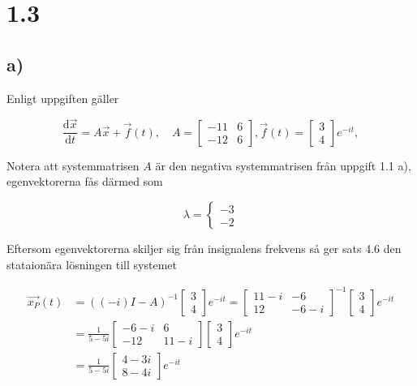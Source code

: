 \documentclass[a4paper]{article}
\newcommand{\mat}[1]{\bm{\mathit{#1}}}
\begin{document}
\section*{1.3}
\subsection*{a)}

Enligt uppgiften gäller

\begin{equation*}
  \frac{\text{d}\vec{x}}{\text{d}t} = \mat{A}\vec{x} + \vec{f}(t), \quad \mat{A} = \begin{bmatrix}-11 & 6\\-12 & 6\end{bmatrix}, \vec{f}(t) = \begin{bmatrix}3\\4\end{bmatrix}e^{-it},
\end{equation*}

\noindent Notera att systemmatrisen $\mat{A}$ är den negativa systemmatrisen
från uppgift 1.1 a), egenvektorerna fås därmed som

\begin{equation*}
  \lambda = \begin{cases}-3\\-2\end{cases}
\end{equation*}

\noindent Eftersom egenvektorerna skiljer sig från insignalens frekvens så ger
sats 4.6 den stataionära lösningen till systemet

\begin{align*}
  \vec{x_P}(t) &= ((-i)\mat{I} - \mat{A})^{-1}\begin{bmatrix}3\\4\end{bmatrix}e^{-it} = \begin{bmatrix}11-i & -6\\12 & -6-i\end{bmatrix}^{-1}\begin{bmatrix}3\\4\end{bmatrix}e^{-it}\\[2ex]
  &= \frac{1}{5-5i}\begin{bmatrix}-6-i & 6\\ -12& 11 - i\end{bmatrix}\begin{bmatrix}3\\4\end{bmatrix}e^{-it}\\[2ex]
  &= \frac{1}{5-5i}\begin{bmatrix}4-3i\\8-4i\end{bmatrix}e^{-it}
\end{align*}
\end{document}
